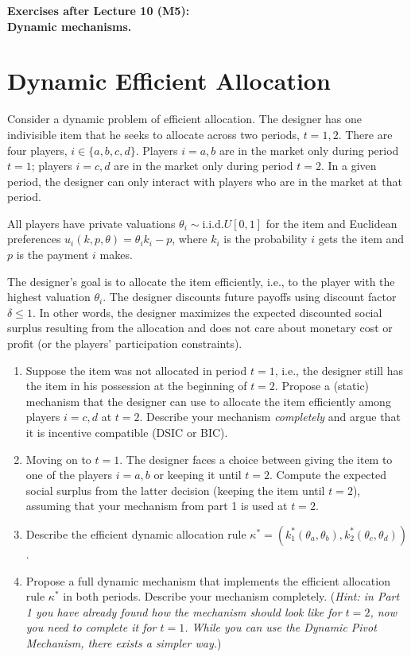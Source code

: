 \documentclass[a4paper]{article}
\begin{document}
\begin{center}
		\LARGE\textbf{Exercises after Lecture 10 (M5):\\ Dynamic mechanisms.}
\end{center}



\section{Dynamic Efficient Allocation}
	Consider a dynamic problem of efficient allocation. The designer has one indivisible item that he seeks to allocate across two periods, $t=1,2$. There are four players, $i\in \{a,b,c,d\}$. Players $i=a,b$ are in the market only during period $t=1$; players $i=c,d$ are in the market only during period $t=2$. In a given period, the designer can only interact with players who are in the market at that period. 
	
	All players have private valuations $\theta_i \sim \text{i.i.d.}U[0,1]$ for the item and Euclidean preferences $u_i(k,p,\theta) = \theta_i k_i - p$, where $k_i$ is the probability $i$ gets the item and $p$ is the payment $i$ makes.
	
	The designer's goal is to allocate the item efficiently, i.e., to the player with the highest valuation $\theta_i$. The designer discounts future payoffs using discount factor $\delta \leq 1$. In other words, the designer maximizes the expected discounted social surplus resulting from the allocation and does not care about monetary cost or profit (or the players' participation constraints).
	
	\begin{enumerate}
		\item Suppose the item was not allocated in period $t=1$, i.e., the designer still has the item in his possession at the beginning of $t=2$. Propose a (static) mechanism that the designer can use to allocate the item efficiently among players $i=c,d$ at $t=2$. Describe your mechanism \emph{completely} and argue that it is incentive compatible (DSIC or BIC).
		\item Moving on to $t=1$. The designer faces a choice between giving the item to one of the players $i=a,b$ or keeping it until $t=2$. 
		Compute the expected social surplus from the latter decision (keeping the item until $t=2$), assuming that your mechanism from part 1 is used at $t=2$.
		\item Describe the efficient dynamic allocation rule $\kappa^* = (k^*_1(\theta_a,\theta_b), k^*_2(\theta_c,\theta_d))$.
		\item Propose a full dynamic mechanism that implements the efficient allocation rule $\kappa^*$ in both periods. Describe your mechanism completely. (\emph{Hint: in Part 1 you have already found how the mechanism should look like for $t=2$, now you need to complete it for $t=1$. While you can use the Dynamic Pivot Mechanism, there exists a simpler way.})
	\end{enumerate}
	
\end{document}
